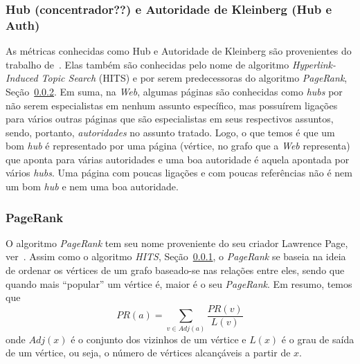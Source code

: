 \subsubsection{Hub (concentrador??) e Autoridade de Kleinberg (Hub e Auth)}
\label{subsubsection::hub}
As métricas conhecidas como Hub e Autoridade de Kleinberg são provenientes do trabalho de~\cite{Kleinberg99}. Elas também são conhecidas pelo nome de algoritmo \textit{Hyperlink-Induced Topic Search} (HITS) e por serem predecessoras do algoritmo \textit{PageRank}, Seção~\ref{subsubsection::pagerank}. Em suma, na \textit{Web}, algumas páginas são conhecidas como \textit{hubs} por não serem especialistas em nenhum assunto específico, mas possuírem ligações para vários outras páginas que são especialistas em seus respectivos assuntos, sendo, portanto, \textit{autoridades} no assunto tratado. Logo, o que temos é que um bom \textit{hub} é representado por uma página (vértice, no grafo que a \textit{Web} representa) que aponta para várias autoridades e uma boa autoridade é aquela apontada por vários \textit{hubs}. Uma página com poucas ligações e com poucas referências não é nem um bom \textit{hub} e nem uma boa autoridade.

\subsubsection{PageRank}
\label{subsubsection::pagerank}

O algoritmo \textit{PageRank} tem seu nome proveniente do seu criador Lawrence Page, ver~\cite{Page98}. Assim como o algoritmo \textit{HITS}, Seção~\ref{subsubsection::hub}, o \textit{PageRank} se baseia na ideia de ordenar os vértices de um grafo baseado-se nas relações entre eles, sendo que quando mais ``popular'' um vértice é, maior é o seu \textit{PageRank}. Em resumo, temos que
\begin{equation}\label{eqn::pagerank}
PR(a) = \sum_{v \in Adj(a)} \frac{PR(v)}{L(v)}
\end{equation}
onde $Adj(x)$ é o conjunto dos vizinhos de um vértice e $L(x)$ é o grau de saída de um vértice, ou seja, o número de vértices alcançáveis a partir de $x$.



